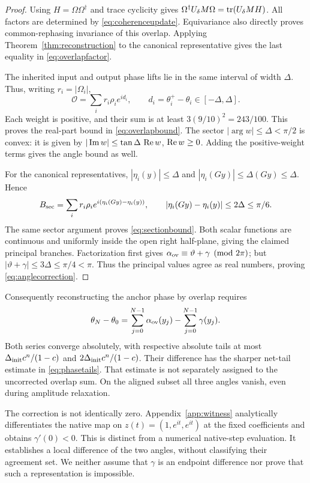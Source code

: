 \begin{proof}
Using \(H=\Omega\Omega^\dagger\) and trace cyclicity gives
\(\Omega^\dagger U_\delta M\Omega=\operatorname{tr}(U_\delta MH)\).
All factors are determined by \eqref{eq:coherenceupdate}. Equivariance also directly proves common-rephasing invariance of this overlap. Applying Theorem~\ref{thm:reconstruction} to the canonical representative gives the last equality in \eqref{eq:overlapfactor}.

The inherited input and output phase lifts lie in the same interval of width \(\Delta\). Thus, writing \(r_i=|\Omega_i|\),
\[
\mathcal O=\sum_i r_i\rho_i e^{id_i},\qquad
d_i=\theta_i^+-\theta_i\in[-\Delta,\Delta].
\]
Each weight is positive, and their sum is at least \(3(9/10)^2=243/100\). This proves the real-part bound in \eqref{eq:overlapbound}. The sector \(|\arg w|\le\Delta<\pi/2\) is convex: it is given by \(|\operatorname{Im} w|\le\tan\Delta\,\operatorname{Re} w\), \(\operatorname{Re} w\ge0\). Adding the positive-weight terms gives the angle bound as well.

For the canonical representatives, \(|\eta_i(y)|\le\Delta\) and \(|\eta_i(Gy)|\le\Delta(Gy)\le\Delta\). Hence
\[
B_{\rm sec}=\sum_i r_i\rho_i
e^{i(\eta_i(Gy)-\eta_i(y))},\qquad
|\eta_i(Gy)-\eta_i(y)|\le2\Delta\le\pi/6.
\]
The same sector argument proves \eqref{eq:sectionbound}. Both scalar functions are continuous and uniformly inside the open right half-plane, giving the claimed principal branches. Factorization first gives \(\alpha_{\rm ov}\equiv\vartheta+\gamma\pmod{2\pi}\); but \(|\vartheta+\gamma|\le3\Delta\le\pi/4<\pi\). Thus the principal values agree as real numbers, proving \eqref{eq:anglecorrection}.
\end{proof}

Consequently reconstructing the anchor phase by overlap requires
\begin{equation}
\theta_N-\theta_0=\sum_{j=0}^{N-1}\alpha_{\rm ov}(y_j)
-\sum_{j=0}^{N-1}\gamma(y_j).
\label{eq:correctedsum}
\end{equation}
Both series converge absolutely, with respective absolute tails at most
\(\Delta_{\rm init}c^n/(1-c)\) and \(2\Delta_{\rm init}c^n/(1-c)\).
Their difference has the sharper net-tail estimate in \eqref{eq:phasetails}. That estimate is not separately assigned to the uncorrected overlap sum. On the aligned subset all three angles vanish, even during amplitude relaxation.

The correction is not identically zero. Appendix~\ref{app:witness} analytically differentiates the native map on \(z(t)=(1,e^{it},e^{it})\) at the fixed coefficients and obtains \(\gamma'(0)<0\). This is distinct from a numerical native-step evaluation. It establishes a local difference of the two angles, without classifying their agreement set. We neither assume that \(\gamma\) is an endpoint difference nor prove that such a representation is impossible.

